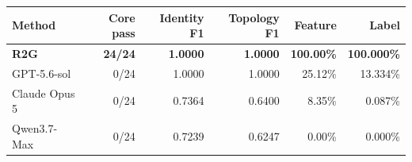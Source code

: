 \begin{tabular}{lrrrrr}\toprule
Method & Core pass & Identity F1 & Topology F1 & Feature & Label\\\midrule
\textbf{R2G} & \textbf{24/24} & \textbf{1.0000} & \textbf{1.0000} & \textbf{100.00\%} & \textbf{100.000\%}\\
GPT-5.6-sol & 0/24 & 1.0000 & 1.0000 & 25.12\% & 13.334\%\\
Claude Opus 5 & 0/24 & 0.7364 & 0.6400 & 8.35\% & 0.087\%\\
Qwen3.7-Max & 0/24 & 0.7239 & 0.6247 & 0.00\% & 0.000\%\\
\bottomrule\end{tabular}
